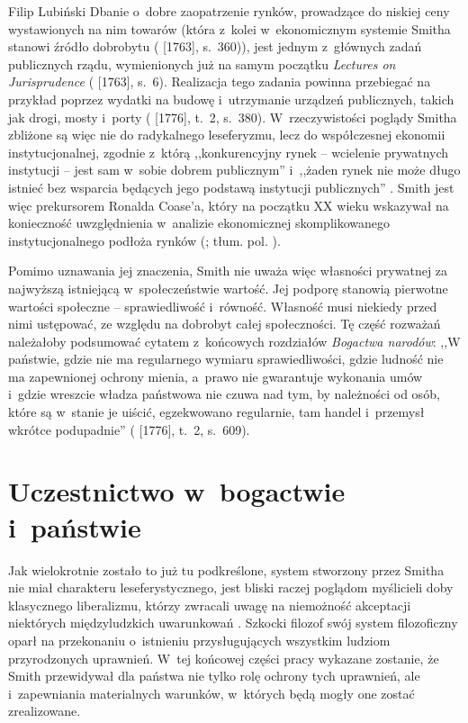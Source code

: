 \begin{artplenv}{Filip Lubiński}
Dbanie o~dobre zaopatrzenie rynków, prowadzące do niskiej ceny wystawionych na nim towarów
(która z~kolei w~ekonomicznym systemie Smitha stanowi źródło dobrobytu
(\cite{smith_lectures_1982} [1763], s.~360)),
jest
jednym z~głównych zadań publicznych rządu, wymienionych już na samym początku \textit{Lectures on Jurisprudence}
(\cite{smith_lectures_1982} [1763], s.~6).
Realizacja tego zadania powinna przebiegać na przykład poprzez
wydatki na budowę i~utrzymanie urządzeń publicznych, takich jak drogi, mosty i~porty
(\cite{smith_badania_2007} [1776], t.~2, s.~380).
W~rzeczywistości poglądy Smitha zbliżone są więc nie do radykalnego leseferyzmu, lecz do
współczesnej ekonomii instytucjonalnej, zgodnie z~którą ,,konkurencyjny rynek -- wcielenie prywatnych instytucji -- jest
sam w~sobie dobrem publicznym'' i~,,żaden rynek nie może długo istnieć bez wsparcia będących jego podstawą instytucji
publicznych''
\parencite[s.~20]{ostrom_dysponowanie_2013}.
Smith jest więc prekursorem Ronalda Coase'a, który na
początku XX wieku wskazywał na konieczność uwzględnienia w~analizie ekonomicznej skomplikowanego instytucjonalnego
podłoża rynków
(\cite[s.~8]{coase_firm_1990}; tłum. pol. \cite*{coase_firma_2013}).

Pomimo uznawania jej znaczenia, Smith nie uważa więc własności prywatnej za najwyższą istniejącą w~społeczeństwie
wartość. Jej podporę stanowią pierwotne wartości społeczne -- sprawiedliwość i~równość. Własność musi niekiedy przed
nimi ustępować, ze względu na dobrobyt całej społeczności. Tę część rozważań należałoby podsumować cytatem z~końcowych
rozdziałów \textit{Bogactwa narodów}: ,,W państwie, gdzie nie ma regularnego wymiaru sprawiedliwości, gdzie ludność nie
ma zapewnionej ochrony mienia, a~prawo nie gwarantuje wykonania umów i~gdzie wreszcie władza państwowa nie czuwa nad
tym, by należności od osób, które są w~stanie je uiścić, egzekwowano regularnie, tam handel i~przemysł wkrótce
podupadnie''
(\cite{smith_badania_2007} [1776], t.~2, s.~609).

\section{Uczestnictwo w~bogactwie i~państwie}
Jak wielokrotnie zostało to już tu podkreślone, system stworzony przez Smitha nie miał charakteru leseferystycznego,
jest bliski raczej poglądom myślicieli doby klasycznego liberalizmu, którzy zwracali uwagę na niemożność akceptacji
niektórych międzyludzkich uwarunkowań
\parencite[s.~215]{rawls_wyklady_2010}.
Szkocki filozof swój system
filozoficzny oparł na przekonaniu o~istnieniu przysługujących wszystkim ludziom przyrodzonych uprawnień. W~tej końcowej
części pracy wykazane zostanie, że Smith przewidywał dla państwa nie tylko rolę ochrony tych uprawnień,
ale i~zapewniania materialnych warunków, w~których będą mogły one zostać zrealizowane.


\end{artplenv}
